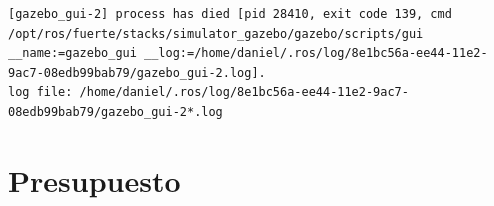 \documentclass[12pt, a4paper]{report}
\begin{document}
\begin{verbatim}
[gazebo_gui-2] process has died [pid 28410, exit code 139, cmd /opt/ros/fuerte/stacks/simulator_gazebo/gazebo/scripts/gui __name:=gazebo_gui __log:=/home/daniel/.ros/log/8e1bc56a-ee44-11e2-9ac7-08edb99bab79/gazebo_gui-2.log].
log file: /home/daniel/.ros/log/8e1bc56a-ee44-11e2-9ac7-08edb99bab79/gazebo_gui-2*.log
\end{verbatim}

\part{Presupuesto}

\end{document}
